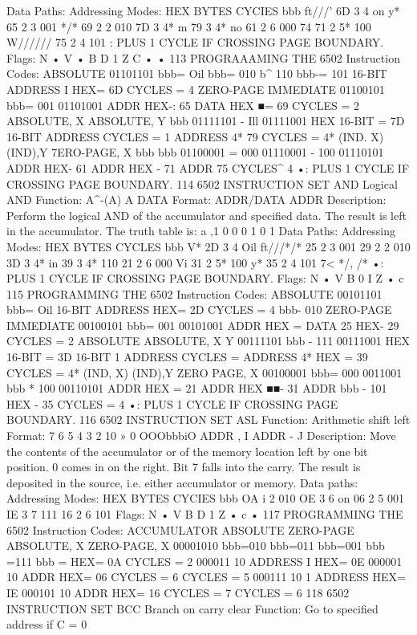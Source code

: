 \documentclass{book}
\begin{document}
Data Paths:
Addressing Modes:
HEX
BYTES
CYCIES
bbb
ft///'
6D
3
4
on
y*
65
2
3
001
*/*
69
2
2
010
7D
3
4*
m
79
3
4*
no
61
2
6
000
74
71
2
5*
100
W//////
75
2
4
101
: PLUS 1 CYCLE IF CROSSING PAGE BOUNDARY.
Flags: N
•
V
•
B D 1 Z C
• •
113
PROGRAAAMING THE 6502
Instruction Codes:
ABSOLUTE 01101101
bbb= Oil
bbb= 010
b^ 110
bbb-= 101
16-BIT ADDRESS
I
HEX= 6D CYCLES = 4
ZERO-PAGE
IMMEDIATE
01100101
bbb= 001
01101001
ADDR
HEX-: 65
DATA
HEX ■= 69 CYCLES = 2
ABSOLUTE, X
ABSOLUTE, Y
bbb
01111101
- Ill
01111001
HEX
16-BIT
= 7D
16-BIT
ADDRESS
CYCLES =
1
ADDRESS
4*
79 CYCLES = 4*
(IND. X)
(IND),Y
7ERO-PAGE, X
bbb
bbb
01100001
= 000
01110001
- 100
01110101
ADDR
HEX- 61
ADDR
HEX - 71
ADDR
75 CYCLES^ 4
•: PLUS 1 CYCLE IF CROSSING PAGE BOUNDARY.
114
6502 INSTRUCTION SET
AND Logical AND
Function: A^-(A) A DATA
Format: ADDR/DATA ADDR
Description:
Perform the logical AND of the accumulator and specified data.
The result is left in the accumulator.
The truth table is:
a
,1
0
0
0
1
0
1
Data Paths:
Addressing Modes:
HEX
BYTES
CYCLES
bbb
V*
2D
3
4
Oil
ft///*/*
25
2
3
001
29
2
2
010
3D
3
4*
in
39
3
4*
110
21
2
6
000
Vi
31
2
5*
100
y*
35
2
4
101
7<
*/,
/*
•: PLUS 1 CYCLE IF CROSSING PAGE BOUNDARY.
Flags:
N
•
V B 0 I Z
•
c
115
PROGRAMMING THE 6502
Instruction Codes:
ABSOLUTE 00101101
bbb= Oil
16-BIT ADDRESS
HEX= 2D CYCLES = 4
bbb- 010
ZERO-PAGE
IMMEDIATE
00100101
bbb= 001
00101001
ADDR
HEX =
DATA
25
HEX- 29 CYCLES = 2
ABSOLUTE
ABSOLUTE,
X
Y
00111101
bbb - 111
00111001
HEX
16-BIT
= 3D
16-BIT
1
ADDRESS
CYCLES =
ADDRESS
4*
HEX = 39 CYCLES = 4*
(IND, X)
(IND),Y
ZERO PAGE, X
00100001
bbb= 000
0011001
bbb * 100
00110101
ADDR
HEX = 21
ADDR
HEX ■■- 31
ADDR
bbb - 101 HEX - 35 CYCLES = 4
•: PLUS 1 CYCLE IF CROSSING PAGE BOUNDARY.
116
6502 INSTRUCTION SET
ASL
Function:
Arithmetic shift left
Format:
7 6 5 4 3 2 10 » 0
OOObbbiO ADDR
,
I ADDR
- J
Description:
Move the contents of the accumulator or of the memory location
left by one bit position. 0 comes in on the right. Bit 7 falls into the
carry. The result is deposited in the source, i.e. either accumulator
or memory.
Data paths:
Addressing Modes:
HEX
BYTES
CYCIES
bbb
OA
i
2
010
OE
3
6
on
06
2
5
001
IE
3
7
111
16
2
6
101
Flags:
N
•
V B D 1 Z
•
c
•
117
PROGRAMMING THE 6502
Instruction Codes:
ACCUMULATOR
ABSOLUTE
ZERO-PAGE
ABSOLUTE, X
ZERO-PAGE, X
00001010
bbb=010
bbb=011
bbb=001
bbb =111
bbb =
HEX= 0A CYCLES = 2
000011 10 ADDRESS
I
HEX= 0E
000001 10 ADDR
HEX= 06
CYCLES = 6
CYCLES = 5
000111 10
1
ADDRESS
HEX= IE
000101 10 ADDR
HEX= 16
CYCLES = 7
CYCLES = 6
118
6502 INSTRUCTION SET
BCC Branch on carry clear
Function:
Go to specified address if C = 0
\end{document}
